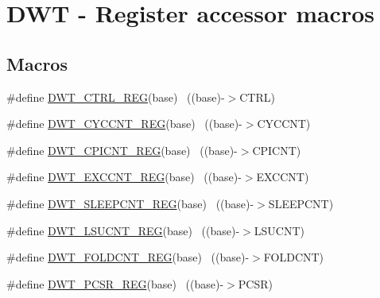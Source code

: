\hypertarget{group___d_w_t___register___accessor___macros}{}\section{D\+WT -\/ Register accessor macros}
\label{group___d_w_t___register___accessor___macros}
\subsection*{Macros}
\begin{DoxyCompactItemize}
\item 
\#define \hyperlink{group___d_w_t___register___accessor___macros_ga805e8330d1aa986d534abe1eed2614df}{D\+W\+T\+\_\+\+C\+T\+R\+L\+\_\+\+R\+EG}(base)                                          ~((base)-\/$>$C\+T\+RL)
\item 
\#define \hyperlink{group___d_w_t___register___accessor___macros_ga745c3ae737eb0e94dde4b3e1178920af}{D\+W\+T\+\_\+\+C\+Y\+C\+C\+N\+T\+\_\+\+R\+EG}(base)                                      ~((base)-\/$>$C\+Y\+C\+C\+NT)
\item 
\#define \hyperlink{group___d_w_t___register___accessor___macros_ga57a7caeb5e0d4038c88b5adb8a31ac4e}{D\+W\+T\+\_\+\+C\+P\+I\+C\+N\+T\+\_\+\+R\+EG}(base)                                      ~((base)-\/$>$C\+P\+I\+C\+NT)
\item 
\#define \hyperlink{group___d_w_t___register___accessor___macros_gacfd254c94211e8165496d8c22a02b996}{D\+W\+T\+\_\+\+E\+X\+C\+C\+N\+T\+\_\+\+R\+EG}(base)                                      ~((base)-\/$>$E\+X\+C\+C\+NT)
\item 
\#define \hyperlink{group___d_w_t___register___accessor___macros_gad4f054164e8c0594edcc3672d3122903}{D\+W\+T\+\_\+\+S\+L\+E\+E\+P\+C\+N\+T\+\_\+\+R\+EG}(base)                                  ~((base)-\/$>$S\+L\+E\+E\+P\+C\+NT)
\item 
\#define \hyperlink{group___d_w_t___register___accessor___macros_ga1b22a818a9d093362624b64053cd8b6d}{D\+W\+T\+\_\+\+L\+S\+U\+C\+N\+T\+\_\+\+R\+EG}(base)                                      ~((base)-\/$>$L\+S\+U\+C\+NT)
\item 
\#define \hyperlink{group___d_w_t___register___accessor___macros_gaeb8e407cb620f678d367fae5467d486a}{D\+W\+T\+\_\+\+F\+O\+L\+D\+C\+N\+T\+\_\+\+R\+EG}(base)                                    ~((base)-\/$>$F\+O\+L\+D\+C\+NT)
\item 
\#define \hyperlink{group___d_w_t___register___accessor___macros_ga19fcf102babeb34ec17bc96dd4d08e52}{D\+W\+T\+\_\+\+P\+C\+S\+R\+\_\+\+R\+EG}(base)                                          ~((base)-\/$>$P\+C\+SR)

\end{DoxyCompactItemize}
